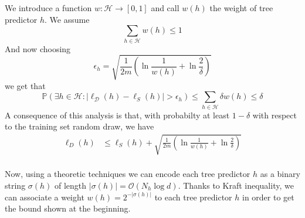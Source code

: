 \begin{itemize}
        We introduce a function $w : \mathcal{H} \rightarrow [0, 1]$ and call $w(h)$ the weight of tree predictor $h$. We assume 
        $$
        \sum_{h \in \mathcal{H}^{}} w(h) \leq 1
        $$
        And now choosing 
        $$
        \epsilon_h = \sqrt{\frac{1}{2m} \left(\ln \frac{1}{w(h)} + \ln \frac{2}{\delta} \right)}
        $$
        we get that 
        $$
        \mathbb{P} \left( \exists h \in \mathcal{H} : |\ell_{\mathcal{D}}(h) - \ell_{S}(h)| > \epsilon_h \right) \leq \sum_{h \in \mathcal{H}} \delta w(h) \leq \delta 
        $$
        A consequence of this analysis is that, with probabilty at least $1 - \delta$ with respect to the training set random draw, we have
        \begin{equation}
            \begin{split}
            \ell_{D}(h) & \leq \ell_{S}(h) + \sqrt{\frac{1}{2m} \left(\ln \frac{1}{w(h)} + \ln \frac{2}{\delta} \right)}\\
            \end{split}
        \end{equation}

        Now, using a theoretic techniques we can encode each tree predictor $h$ as a binary string $\sigma(h)$ of length $|\sigma(h)| = \mathcal{O}(N_h \log d)$. Thanks to Kraft inequality, we can associate a weight $w(h) = 2^{-|\sigma(h)|}$ to each tree predictor $h$ in order to get the bound shown at the beginning.\\ 
\end{itemize}

